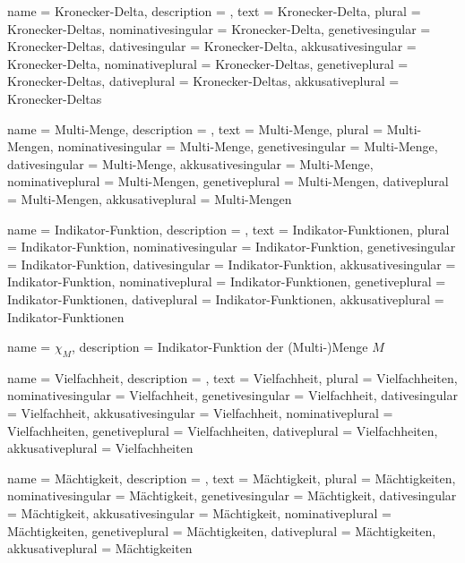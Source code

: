{
    name               = {Kronecker-Delta},
    description        = {},
    text               = {Kronecker-Delta},
    plural             = {Kronecker-Deltas},
    nominativesingular = {Kronecker-Delta},
    genetivesingular   = {Kronecker-Deltas},
    dativesingular     = {Kronecker-Delta},
    akkusativesingular = {Kronecker-Delta},
    nominativeplural   = {Kronecker-Deltas},
    genetiveplural     = {Kronecker-Deltas},
    dativeplural       = {Kronecker-Deltas},
    akkusativeplural   = {Kronecker-Deltas}
}

{
    name               = {Multi-Menge},
    description        = {},
    text               = {Multi-Menge},
    plural             = {Multi-Mengen},
    nominativesingular = {Multi-Menge},
    genetivesingular   = {Multi-Menge},
    dativesingular     = {Multi-Menge},
    akkusativesingular = {Multi-Menge},
    nominativeplural   = {Multi-Mengen},
    genetiveplural     = {Multi-Mengen},
    dativeplural       = {Multi-Mengen},
    akkusativeplural   = {Multi-Mengen}
}

{
    name               = {Indikator-Funktion},
    description        = {},
    text               = {Indikator-Funktionen},
    plural             = {Indikator-Funktion},
    nominativesingular = {Indikator-Funktion},
    genetivesingular   = {Indikator-Funktion},
    dativesingular     = {Indikator-Funktion},
    akkusativesingular = {Indikator-Funktion},
    nominativeplural   = {Indikator-Funktionen},
    genetiveplural     = {Indikator-Funktionen},
    dativeplural       = {Indikator-Funktionen},
    akkusativeplural   = {Indikator-Funktionen}
}

{
    name        = {$\chi_M$},
    description = {Indikator-Funktion der (Multi-)Menge $M$}
}

{
    name               = {Vielfachheit},
    description        = {},
    text               = {Vielfachheit},
    plural             = {Vielfachheiten},
    nominativesingular = {Vielfachheit},
    genetivesingular   = {Vielfachheit},
    dativesingular     = {Vielfachheit},
    akkusativesingular = {Vielfachheit},
    nominativeplural   = {Vielfachheiten},
    genetiveplural     = {Vielfachheiten},
    dativeplural       = {Vielfachheiten},
    akkusativeplural   = {Vielfachheiten}
}

{
    name               = {Mächtigkeit},
    description        = {},
    text               = {Mächtigkeit},
    plural             = {Mächtigkeiten},
    nominativesingular = {Mächtigkeit},
    genetivesingular   = {Mächtigkeit},
    dativesingular     = {Mächtigkeit},
    akkusativesingular = {Mächtigkeit},
    nominativeplural   = {Mächtigkeiten},
    genetiveplural     = {Mächtigkeiten},
    dativeplural       = {Mächtigkeiten},
    akkusativeplural   = {Mächtigkeiten}
}

